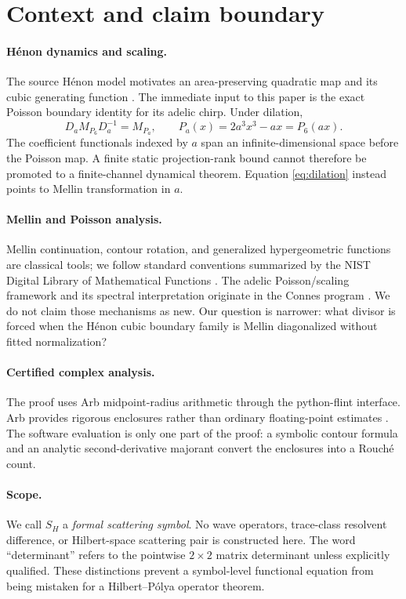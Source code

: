 \section{Context and claim boundary}

\paragraph{H\'enon dynamics and scaling.}
The source H\'enon model motivates an area-preserving quadratic map and its
cubic generating function \citep{Wang2026HenonModel}. The immediate input to this paper is the exact
Poisson boundary identity for its adelic chirp. Under dilation,
\begin{equation}\label{eq:dilation}
D_aM_{P_6}D_a^{-1}=M_{P_a},
\qquad P_a(x)=2a^3x^3-ax=P_6(ax).
\end{equation}
The coefficient functionals indexed by $a$ span an infinite-dimensional
space before the Poisson map. A finite static projection-rank bound cannot
therefore be promoted to a finite-channel dynamical theorem. Equation
\eqref{eq:dilation} instead points to Mellin transformation in $a$.

\paragraph{Mellin and Poisson analysis.}
Mellin continuation, contour rotation, and generalized hypergeometric
functions are classical tools; we follow standard conventions summarized by
the NIST Digital Library of Mathematical Functions
\citep{DLMFMellin,DLMFHyper}. The adelic Poisson/scaling framework and its
spectral interpretation originate in the Connes program
\citep{Connes1999,ConnesConsani2020}. We do not claim those mechanisms as
new. Our question is narrower: what divisor is forced when the H\'enon cubic
boundary family is Mellin diagonalized without fitted normalization?

\paragraph{Certified complex analysis.}
The proof uses Arb midpoint-radius arithmetic through the python-flint
interface. Arb provides rigorous enclosures rather than ordinary
floating-point estimates \citep{Johansson2017Arb}. The software evaluation
is only one part of the proof: a symbolic contour formula and an analytic
second-derivative majorant convert the enclosures into a Rouch\'e count.

\paragraph{Scope.}
We call $S_H$ a \emph{formal scattering symbol}. No wave operators,
trace-class resolvent difference, or Hilbert-space scattering pair is
constructed here. The word ``determinant'' refers to the pointwise
$2\times2$ matrix determinant unless explicitly qualified. These
distinctions prevent a symbol-level functional equation from being mistaken
for a Hilbert--P\'olya operator theorem.
